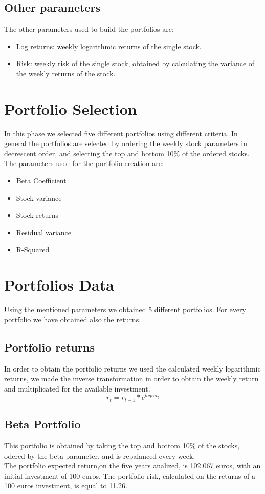\documentclass[12pt, a4paper, twocolumn]{article} %
\begin{document}
	\subsection{Other parameters}
	The other parameters used to build the portfolios are:
	\begin{itemize}
		\item Log returns: weekly logarithmic returns of the single stock.
		\item Risk: weekly risk of the single stock, obtained by calculating the variance of the weekly returns of the stock.
	\end{itemize}
	
	\section{Portfolio Selection}
	In this phase we selected five different portfolios using different criteria. In general the portfolios are selected by ordering the weekly stock parameters in decrescent order, and selecting the top and bottom 10\% of the ordered stocks.
	The parameters used for the portfolio creation are:
	\begin{itemize}
		\item Beta Coefficient
		\item Stock variance
		\item Stock returns
		\item Residual variance
		\item R-Squared
	\end{itemize}
	\section{Portfolios Data}
	Using the mentioned parameters we obtained 5 different portfolios. For every portfolio we have obtained also the returns.
	\subsection{Portfolio returns}
	In order to obtain the portfolio returns we used the calculated weekly logarithmic returns, we made the inverse transformation in order to obtain the weekly return and multiplicated for the available investment.
	\[
	r_{t}	= r_{t-1}*e^{logret_{t}}
	\]
	\subsection{Beta Portfolio}
	This portfolio is obtained by taking the top and bottom 10\% of the stocks, odered by the beta parameter, and is rebalanced every week.\\
	The portfolio expected return,on the five years analized, is 102.067 euros, with an initial investment of 100 euros. The portfolio risk, calculated on the returns of a 100 euros investment, is equal to 11.26.
\end{document}
